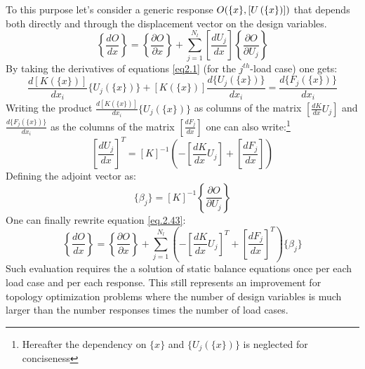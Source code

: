   To this purpose let's consider a generic response $O(\lbrace x\rbrace,  \left[{U\left(\lbrace x\rbrace\right)}\right])$ that depends both directly and  through the displacement vector on the design variables. 
  \begin{equation}
  \label{eq.2.43}
  \left\lbrace\frac{d O }{dx}\right\rbrace=\left\lbrace\frac{ \partial O }{ \partial x}\right\rbrace+\sum_{j=1}^{N_l}{\left[\frac{d U_j }{ d x}\right]\left\lbrace\frac{ \partial O }{ \partial U_j}\right\rbrace}
  \end{equation}
  By taking the derivatives of equations \eqref{eq2.1} (for the $j^{th}$-load case) one gets:
   \begin{equation}
   \label{eq.2.41}
   \frac{d\left[K(\lbrace x\rbrace)\right]}{dx_i}\lbrace U_j (\lbrace x\rbrace) \rbrace+\left[K(\lbrace x\rbrace)\right]\frac{d \lbrace U_j (\lbrace x\rbrace) \rbrace}{dx_i} = \frac{d\lbrace F_j(\lbrace x\rbrace) \rbrace}{dx_i} 
   \end{equation}
   Writing the product $\frac{d\left[K(\lbrace x\rbrace)\right]}{dx_i}\lbrace U_j (\lbrace x\rbrace) \rbrace$ as columns of the matrix $\left[\frac{dK}{dx}U_j\right]$ and $\frac{d\lbrace F_j(\lbrace x\rbrace) \rbrace}{dx_i} $ as the columns of the matrix $\left[\frac{dF_j}{dx}\right]$ one can also write:\footnote{Hereafter the dependency on $\lbrace x\rbrace$ and $\lbrace U_j (\lbrace x\rbrace) \rbrace$ is neglected for conciseness}
   \begin{equation}
   \left[\frac{d U_j }{ d x}\right]^T=\left[K\right]^{-1}\left(-\left[\frac{dK}{dx}U_j\right] +\left[\frac{dF_j}{dx}\right]\right)
   \end{equation}
   Defining the adjoint vector as:
   \begin{equation}
   \label{eq.2.46}
   \lbrace\beta_j  \rbrace=\left[K\right]^{-1}\left\lbrace\frac{ \partial O }{ \partial U_j}\right\rbrace
   \end{equation}
   One can finally rewrite equation \eqref{eq.2.43}:
   \begin{equation}
   \label{eq.2.47}
   \left\lbrace\frac{d O }{dx}\right\rbrace=\left\lbrace\frac{ \partial O }{ \partial x}\right\rbrace+\sum_{j=1}^{N_l}{\left(-\left[\frac{dK}{dx}U_j\right]^T +\left[\frac{dF_j}{dx}\right]^T\right)\lbrace\beta_j \rbrace}
   \end{equation}
   Such evaluation requires the a solution of static balance equations once per each load case and per each response. 
   This still represents an improvement for topology optimization problems where the number of design variables is much larger than the number responses times the number of load cases.
